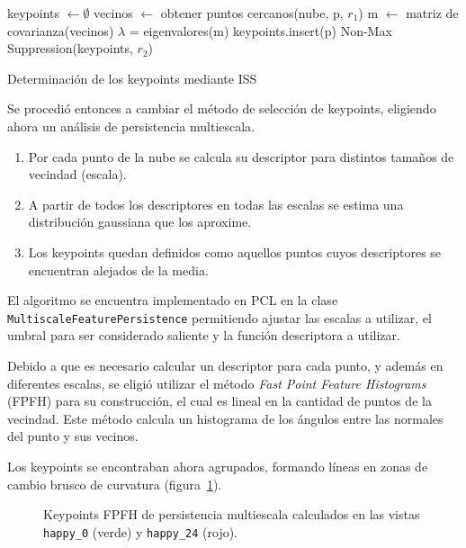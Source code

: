 			\begin{algorithm}
				\begin{algorithmic}[1]
						\State keypoints $\gets\emptyset$
							\State vecinos $\gets$ obtener puntos cercanos(nube, p, $r_1$)
							\State m $\gets$ matriz de covarianza(vecinos)
							\State $\lambda$ = eigenvalores(m)
								\State keypoints.insert(p)
							\EndIf
						\EndFor
						\State\Return Non-Max Suppression(keypoints, $r_2$)
					\EndFunction
				\end{algorithmic}
				\caption{\label{alg:iss}Determinación de los keypoints mediante ISS}
			\end{algorithm}


			Se procedió entonces a cambiar el método de selección de keypoints, eligiendo ahora un análisis de persistencia multiescala\cite{Rusu:2009:FPF:1703435.1703733}.
			\begin{enumerate}
				\item Por cada punto de la nube se calcula su descriptor para distintos tamaños de vecindad (escala).
				\item A partir de todos los descriptores en todas las escalas se estima una distribución gaussiana que los aproxime.
				\item Los keypoints quedan definidos como aquellos puntos cuyos descriptores se encuentran alejados de la media.
			\end{enumerate}
			El algoritmo se encuentra implementado en PCL en la clase
			\texttt{Multiscale\-Feature\-Persistence} permitiendo ajustar las
			escalas a utilizar, el umbral para ser considerado saliente y la
			función descriptora a utilizar.

			Debido a que es necesario calcular un descriptor para cada punto, y
			además en diferentes escalas, se eligió utilizar el método
			\emph{Fast Point Feature Histograms} (FPFH) para su construcción,
			el cual es lineal en la cantidad de puntos de la vecindad.
			Este método calcula un histograma de los ángulos entre las normales del punto y sus vecinos\cite{Rusu:2009:FPF:1703435.1703733}.

			Los keypoints se encontraban ahora agrupados, formando líneas en zonas de cambio brusco de curvatura (figura~\ref{fig:multiscale_key}).

			\begin{figure}
				\caption{\label{fig:multiscale_key}Keypoints FPFH de persistencia multiescala calculados en las vistas \texttt{happy\_0} (verde) y \texttt{happy\_24} (rojo).}
			\end{figure}





